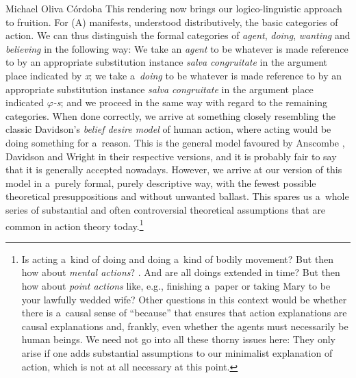 \begin{artengenv}{Michael Oliva Córdoba}
This rendering now brings our logico-linguistic approach to fruition. For (A) manifests, understood distributively, the basic categories of action. We can thus distinguish the formal categories of \textit{agent}, \textit{doing}, \textit{wanting} and \textit{believing} in the following way: We take an \textit{agent} to be whatever is made reference to by an appropriate substitution instance \textit{salva congruitate} in the argument place indicated by \textlquill\textit{x}\textrquill; we take a~\textit{doing} to be whatever is made reference to by an appropriate substitution instance \textit{salva congruitate} in the argument place indicated \textlquill\textit{$\varphi $-s}\textrquill; and we proceed in the same way with regard to the remaining categories. When done correctly, we arrive at something closely resembling the classic Davidson's \textit{belief desire model} of human action, where acting would be doing something for a~reason. This is the general model favoured by Anscombe 
\parencite*[][]{anscombe_intention_1957}, %
 Davidson 
\parencite*[][]{davidson_1963} %
 and Wright 
\parencite*[][]{wright_explanation_1971} %
 in their respective versions, and it is probably fair to say that it is generally accepted nowadays. However, we arrive at our version of this model in a~purely formal, purely descriptive way, with the fewest possible theoretical presuppositions and without unwanted ballast. This spares us a~whole series of substantial and often controversial theoretical assumptions that are common in action theory today.\footnote{Is acting a~kind of doing and doing a~kind of bodily movement? But then how about \textit{mental actions}? 
\parencite[cf., e.g.,][]{obrien_mental_2009}. %
 And are all doings extended in time? 
\parencite[][p.158]{frankfurt_problem_1978} %
 But then how about \textit{point actions} like, e.g., finishing a~paper or taking Mary to be your lawfully wedded wife? Other questions in this context would be whether there is a~causal sense of ``because'' that ensures that action explanations are causal explanations 
\parencite[cf.][]{davidson_1963} %
 and, frankly, even whether the agents must necessarily be human beings. We need not go into all these thorny issues here: They only arise if one adds substantial assumptions to our minimalist explanation of action, which is not at all necessary at this point. }




\end{artengenv}
